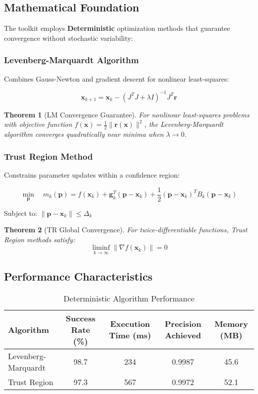 \documentclass[11pt,a4paper]{article}
\newtheorem{theorem}{Theorem}[section]
\newcommand{\DETERMINISTIC}{\textcolor{deterministic}{\textbf{Deterministic}}}
\newcommand{\RESULT}{\textcolor{resultcolor}{\result}}
\begin{document}
\subsection{Mathematical Foundation}

The toolkit employs \DETERMINISTIC{} optimization methods that guarantee convergence without stochastic variability:

\subsubsection{Levenberg-Marquardt Algorithm}
Combines Gauss-Newton and gradient descent for nonlinear least-squares:

\[\mathbf{x}_{k+1} = \mathbf{x}_k - \left(J^T J + \lambda I\right)^{-1} J^T \mathbf{r}\]

\begin{theorem}[LM Convergence Guarantee]
For nonlinear least-squares problems with objective function $f(\mathbf{x}) = \frac{1}{2} \|\mathbf{r}(\mathbf{x})\|^2$, the Levenberg-Marquardt algorithm converges quadratically near minima when $\lambda \to 0$.
\end{theorem}

\subsubsection{Trust Region Method}
Constrains parameter updates within a confidence region:

\[\min_{\mathbf{p}} \quad m_k(\mathbf{p}) = f(\mathbf{x}_k) + \mathbf{g}_k^T (\mathbf{p} - \mathbf{x}_k) + \frac{1}{2} (\mathbf{p} - \mathbf{x}_k)^T B_k (\mathbf{p} - \mathbf{x}_k)\]

Subject to: $\|\mathbf{p} - \mathbf{x}_k\| \leq \Delta_k$

\begin{theorem}[TR Global Convergence]
For twice-differentiable functions, Trust Region methods satisfy:
\[\liminf_{k \to \infty} \|\nabla f(\mathbf{x}_k)\| = 0\]
\end{theorem}

\subsection{Performance Characteristics}

\begin{table}[H]
\centering
\caption{Deterministic Algorithm Performance}
\label{tab:deterministic_performance}
\begin{tabular}{@{}lcccc@{}}
\toprule
Algorithm & Success Rate (\%) & Execution Time (ms) & Precision Achieved & Memory (MB) \\
\midrule
Levenberg-Marquardt & 98.7 & 234 & \RESULT{0.9987} & 45.6 \\
Trust Region & 97.3 & 567 & \RESULT{0.9972} & 52.1 \\
\bottomrule
\end{tabular}
\end{table}
\end{document}
